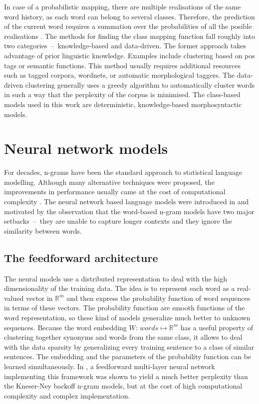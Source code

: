 	In case of a probabilistic mapping, there are multiple realisations of the same word history, as each word can belong to several classes. Therefore, the prediction of the current word requires a summation over the probabilities of all the posible realisations \cite{ney1994structuring}.
	The methods for finding the class mapping function fall roughly into two categories~--~knowledge-based and data-driven. The former approach takes advantage of prior linguistic knowledge. Examples include clustering based on \gls{pos} tags or semantic functions. This method usually requires additional resources such as tagged corpora, wordnets, or automatic morphological taggers. The data-driven clustering generally uses a greedy algorithm to automatically cluster words in such a way that the perplexity of the corpus is minimised. The class-based models used in this work are deterministic, knowledge-based morphosyntactic models.
	\section{Neural network models}
	\label{section:rnn}
	For decades, n-grams have been the standard approach to statistical language modelling. Although many alternative techniques were proposed, the improvements in performance usually came at the cost of computational complexity \cite{mikolov2011rnnlm}. The neural network based language models were introduced in \cite{bengio2003neural} and motivated by the observation that the word-based n-gram models have two major setbacks~--~they are unable to capture longer contexts and they ignore the similarity between words. 
	\subsection{The feedforward architecture}	
The neural models use a distributed representation to deal with the high dimensionality of the training data. The idea is to represent each word as a real-valued vector in $\mathbb{R}^{m}$ and then express the probability function of word sequences in terms of these vectors. The probability function are smooth functions of the word representation, so these kind of models generalize much better to unknown sequences. Because the word embedding $W$: $words \mapsto \mathbb{R}^{m}$ has a useful property of clustering together synonyms and words from the same class, it allows to deal with the data sparsity by generalizing every training sentence to a class of similar sentences. The embedding and the parameters of the probability function can be learned simultaneously. In \cite{bengio2003neural}, a feedforward multi-layer neural network implementing this framework was shown to yield a much better perplexity than the Kneser-Ney backoff n-gram models, but at the cost of high computational complexity and complex implementation.
